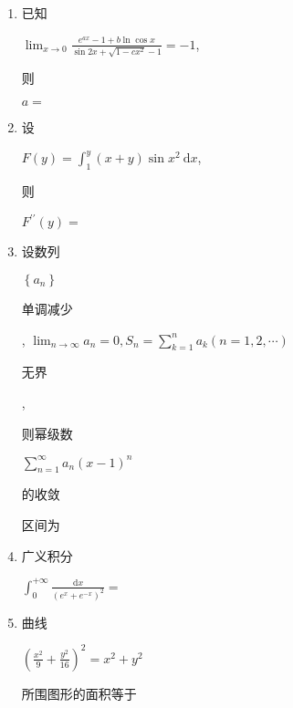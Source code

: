 \documentclass[10pt]{article}
\begin{document}
\begin{enumerate}
  \item \begin{CJK}{UTF8}{mj}已知\end{CJK} $\lim _{x \rightarrow 0} \frac{e^{a x}-1+b \ln \cos x}{\sin 2 x+\sqrt{1-c x^{2}}-1}=-1$, \begin{CJK}{UTF8}{mj}则\end{CJK} $a=$

  \item \begin{CJK}{UTF8}{mj}设\end{CJK} $F(y)=\int_{1}^{y}(x+y) \sin x^{2} \mathrm{~d} x$, \begin{CJK}{UTF8}{mj}则\end{CJK} $F^{\prime \prime}(y)=$

  \item \begin{CJK}{UTF8}{mj}设数列\end{CJK} $\left\{a_{n}\right\}$ \begin{CJK}{UTF8}{mj}单调减少\end{CJK}, $\lim _{n \rightarrow \infty} a_{n}=0, S_{n}=\sum_{k=1}^{n} a_{k}(n=1,2, \cdots)$ \begin{CJK}{UTF8}{mj}无界\end{CJK}, \begin{CJK}{UTF8}{mj}则幂级数\end{CJK} $\sum_{n=1}^{\infty} a_{n}(x-1)^{n}$ \begin{CJK}{UTF8}{mj}的收敛\end{CJK} \begin{CJK}{UTF8}{mj}区间为\end{CJK}

  \item \begin{CJK}{UTF8}{mj}广义积分\end{CJK} $\int_{0}^{+\infty} \frac{\mathrm{d} x}{\left(e^{x}+e^{-x}\right)^{2}}=$

  \item \begin{CJK}{UTF8}{mj}曲线\end{CJK} $\left(\frac{x^{2}}{9}+\frac{y^{2}}{16}\right)^{2}=x^{2}+y^{2}$ \begin{CJK}{UTF8}{mj}所围图形的面积等于\end{CJK}

\end{enumerate}
\end{document}
